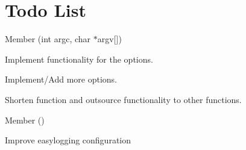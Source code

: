 \chapter{Todo List}
\hypertarget{todo}{}\label{todo}

\begin{DoxyRefList}
\item[Member \doxylink{classutils_1_1StartupHandler_a9cdd57841cee245c1a1c94b0efe6549c}{utils\+::Startup\+Handler\+::get\+Options} (int argc, char \texorpdfstring{$\ast$}{*}argv\mbox{[}\mbox{]})]\label{todo__todo000002}%
%

\begin{DoxyItemize}
\item Implement functionality for the options.
\item Implement/\+Add more options.
\item Shorten function and outsource functionality to other functions. 
\end{DoxyItemize}
\item[Member \doxylink{classutils_1_1StartupHandler_ade70b280d4385f270829b177da44b169}{utils\+::Startup\+Handler\+::init\+Easy\+Logging} ()]\label{todo__todo000001}%
%

\begin{DoxyItemize}
\item Improve easylogging configuration
\end{DoxyItemize}
\end{DoxyRefList}